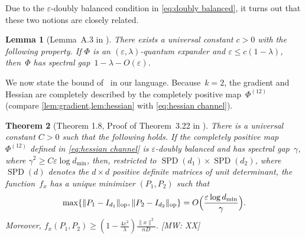 \documentclass[aos]{imsart}
\newtheorem{theorem}{Theorem}[section]
\newtheorem{lemma}[theorem]{Lemma}
\theoremstyle{definition}
\numberwithin{equation}{section}
\DeclareMathOperator{\op}{op}
\DeclareMathOperator{\SSPD}{SPD}
\DeclarePairedDelimiter{\norm}{\lVert}{\rVert}
\newcommand{\eps}{\varepsilon}
\newcommand{\AR}[1]{{\color{orange}[AR: #1]}}
\newcommand{\MW}[1]{{\color{red}[MW: #1]}}
\begin{document}
Due to the $\eps$-doubly balanced condition in \cref{eq:doubly balanced}, it turns out that these two notions are closely related. 
\begin{lemma}[Lemma~A.3 in \cite{FM20}]\label{lem:fm20}
There exists a universal constant $c>0$ with the following property.
If $\Phi$ is an $(\eps,\lambda)$-quantum expander and $\eps \leq c(1-\lambda)$, then~$\Phi$ has spectral gap~$1-\lambda-O(\eps)$.
\end{lemma}

We now state the bound of~\cite{KLR19} in our language.
Because~$k = 2$, the gradient and Hessian are completely described by the completely positive map~$\Phi^{(12)}$ (compare \cref{lem:gradient,lem:hessian} with \cref{eq:hessian channel}).

\begin{theorem}[Theorem 1.8, Proof of Theorem~3.22 in \cite{KLR19}]\label{thm:klr}
There is a universal constant $C>0$ such that the following holds.
If the completely positive map $\Phi^{(12)}$ defined in \cref{eq:hessian channel} is $\eps$-doubly balanced and has spectral gap~$\gamma$, where $\gamma^2 \geq C \eps \log d_{\min}$, then, restricted to $\SSPD(d_1) \times \SSPD(d_2)$, where $\SSPD(d)$ denotes the $d\times d$ positive definite matrices of unit determinant, the function~$f_x$ has a unique minimizer $(P_1,P_2)$ such that
\begin{align*}
  \max \{ \norm{P_1 - I_{d_1}}_{\op}, \norm{P_2 - I_{d_2}}_{\op} \} = O\Bigl(\frac{\eps \log d_{\min}}\gamma\Bigr).
\end{align*}
Moreover, $f_x(P_1, P_2) \geq (1 - \frac{4 \eps^2}{\lambda}) \frac{\|x\|^2}{nD}$. \MW{XX}
\end{theorem}
\end{document}
